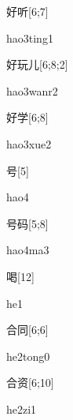 \begin{verbete}{好听}[6;7]
\begin{pronuncia}{hao3ting1}
\end{pronuncia}
\end{verbete}

\begin{verbete}{好玩儿}[6;8;2]
\begin{pronuncia}{hao3wanr2}
\end{pronuncia}
\end{verbete}

\begin{verbete}{好学}[6;8]
\begin{pronuncia}{hao3xue2}
\end{pronuncia}
\end{verbete}

\begin{verbete}[hao4]{号}[5]
\begin{pronuncia}{hao4}
\end{pronuncia}
\end{verbete}

\begin{verbete}[hao4ma3]{号码}[5;8]
\begin{pronuncia}{hao4ma3}
\end{pronuncia}
\end{verbete}

\begin{verbete}[he1]{喝}[12]
\begin{pronuncia}{he1}
\end{pronuncia}
\end{verbete}

\begin{verbete}[he2tong0]{合同}[6;6]
\begin{pronuncia}{he2tong0}
\end{pronuncia}
\end{verbete}

\begin{verbete}[he2zi1]{合资}[6;10]
\begin{pronuncia}{he2zi1}
\end{pronuncia}
\end{verbete}

